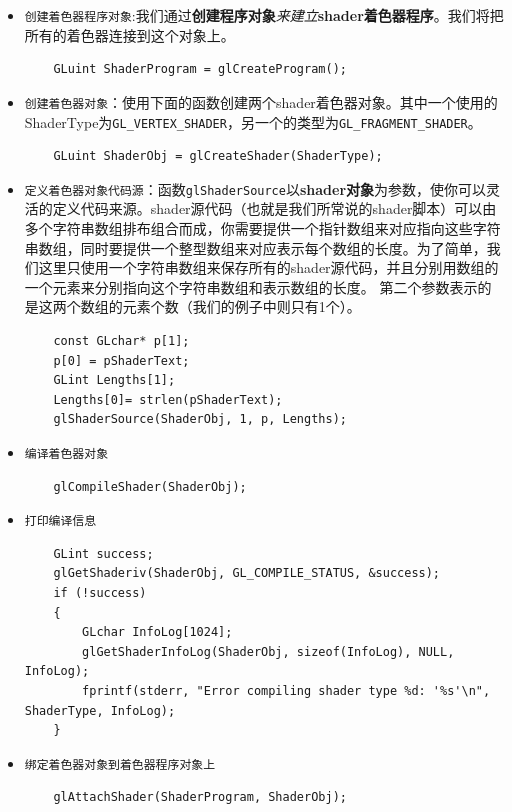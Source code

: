 \documentclass[UTF8,a4paper,12pt]{ctexbook}
\begin{document}
			\begin{itemize}
			\item \verb|创建着色器程序对象|:我们通过\textbf{创建程序对象}\textit{来建立}\textbf{shader着色器程序}。我们将把所有的着色器连接到这个对象上。
			\begin{lstlisting}
	GLuint ShaderProgram = glCreateProgram();
			\end{lstlisting}
			
			\item \verb|创建着色器对象|：使用下面的函数创建两个shader着色器对象。其中一个使用的ShaderType为\verb|GL_VERTEX_SHADER|，另一个的类型为\verb|GL_FRAGMENT_SHADER|。
			\begin{lstlisting}
	GLuint ShaderObj = glCreateShader(ShaderType); 
			\end{lstlisting}
			
			\item \verb|定义着色器对象代码源|：函数\verb|glShaderSource|以\textbf{shader对象}为参数，使你可以灵活的定义代码来源。shader源代码（也就是我们所常说的shader脚本）可以由多个字符串数组排布组合而成，你需要提供一个指针数组来对应指向这些字符串数组，同时要提供一个整型数组来对应表示每个数组的长度。为了简单，我们这里只使用一个字符串数组来保存所有的shader源代码，并且分别用数组的一个元素来分别指向这个字符串数组和表示数组的长度。 
			第二个参数表示的是这两个数组的元素个数（我们的例子中则只有1个）。
			\begin{lstlisting}
	const GLchar* p[1]; 
	p[0] = pShaderText; 
	GLint Lengths[1]; 
	Lengths[0]= strlen(pShaderText); 
	glShaderSource(ShaderObj, 1, p, Lengths);
			\end{lstlisting}
			
			\item \verb|编译着色器对象|
			\begin{lstlisting}
	glCompileShader(ShaderObj); 
			\end{lstlisting}	
			
			\item \verb|打印编译信息|
			\begin{lstlisting}
	GLint success; 
	glGetShaderiv(ShaderObj, GL_COMPILE_STATUS, &success); 
	if (!success) 
	{ 
		GLchar InfoLog[1024]; 
		glGetShaderInfoLog(ShaderObj, sizeof(InfoLog), NULL, InfoLog); 
		fprintf(stderr, "Error compiling shader type %d: '%s'\n", ShaderType, InfoLog); 
	} 
			\end{lstlisting}
		
			\item \verb|绑定着色器对象到着色器程序对象上|
			\begin{lstlisting}
	glAttachShader(ShaderProgram, ShaderObj);
			\end{lstlisting}
			

\end{itemize}
\end{document}
